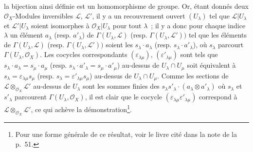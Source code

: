 \begin{env}[5.4.7]
la bijection ainsi définie est un homomorphisme de groupe. Or, étant donnés
deux $\mathcal{O}_X$-Modules inversibles $\mathcal{L}$, $\mathcal{L}'$, il y a
un recouvrement ouvert $(U_\lambda)$ tel que $\mathcal{L}|U_\lambda$ et
$\mathcal{L}'|U_\lambda$ soient isomorphes à $\mathcal{O}_X|U_\lambda$ pour
tout $\lambda$~; il y a donc pour chaque indice $\lambda$ un élément
$a_\lambda$ (resp. $a'_\lambda$) de $\Gamma(U_\lambda,\mathcal{L})$ (resp.
$\Gamma(U_\lambda,\mathcal{L}'))$ tel que les éléments de
$\Gamma(U_\lambda,\mathcal{L})$ (resp. $\Gamma(U_\lambda,\mathcal{L}'))$
soient les $s_\lambda\cdot a_\lambda$ (resp.
$s_\lambda\cdot a'_\lambda$), où $s_\lambda$ parcourt
$\Gamma(U_\lambda,\mathcal{O}_X)$. Les cocycles correspondants
$(\varepsilon_{\lambda\mu})$, $(\varepsilon'_{\lambda\mu})$ sont tels que
$s_\lambda\cdot a_\lambda=s_\mu\cdot a_\mu$ (resp.
$s_\lambda\cdot a'_\lambda=s_\mu\cdot a'_\mu$) au-dessus de
$U_\lambda\cap U_\mu$ soit équivalent à
$s_\lambda=\varepsilon_{\lambda\mu}s_\mu$ (resp.
$s_\lambda=\varepsilon'_{\lambda\mu}s_\mu$) au-dessus de
$U_\lambda\cap U_\mu$. Comme les sections de
$\mathcal{L}\otimes_{\mathcal{O}_X}\mathcal{L}'$ au-dessus de $U_\lambda$
sont les sommes finies des
$s_\lambda s'_\lambda\cdot(a_\lambda\otimes a'_\lambda)$ où $s_\lambda$ et
$s'_\lambda$ parcourent $\Gamma(U_\lambda,\mathcal{O}_X)$, il est clair que
le cocycle $(\varepsilon_{\lambda\mu}\varepsilon'_{\lambda\mu})$ correspond
à $\mathcal{L}\otimes_{\mathcal{O}_X}\mathcal{L}'$, ce qui achève la
démonstration\footnote{Pour une forme générale de ce résultat, voir le livre
cité dans la note de la p.~51.}.
\end{env}

